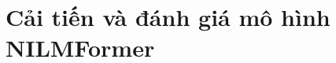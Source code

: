 \documentclass[11pt,a4paper]{article}
\begin{document}
\thispagestyle{empty}

\newpage
\pagestyle{plain}
\setcounter{page}{2}
\renewcommand{\contentsname}{Mục lục}
\tableofcontents
\clearpage


\section{Cải tiến và đánh giá mô hình NILMFormer}\label{sec:nilm}

\clearpage
{\sloppy}

\end{document}

